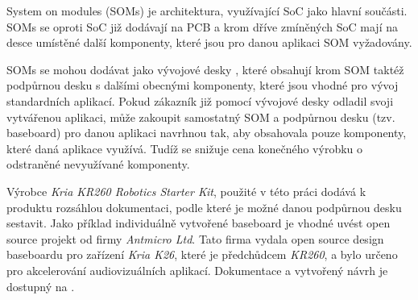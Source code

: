 \documentclass[a4paper, twoside, 11pt]{article}
\begin{document}
	System on modules (SOMs) je architektura, využívající SoC jako hlavní součásti. SOMs se oproti SoC již dodávají na PCB a krom dříve zmíněných SoC mají na desce umístěné další komponenty, které jsou pro danou aplikaci SOM vyžadovány. \cite{xilinx-what-is-a-som}\par
	SOMs se mohou dodávat jako vývojové desky \cite{xilinx-kria-kr260-robotics-starter-kit}, které obsahují krom SOM taktéž podpůrnou desku s dalšími obecnými komponenty, které jsou vhodné pro vývoj standardních aplikací. Pokud zákazník již pomocí vývojové desky odladil svoji vytvářenou aplikaci, může zakoupit samostatný SOM a podpůrnou desku (tzv. baseboard) pro danou aplikaci navrhnou tak, aby obsahovala pouze komponenty, které daná aplikace využívá. Tudíž se snižuje cena konečného výrobku o odstraněné nevyužívané komponenty.\par
	Výrobce \textit{Kria KR260 Robotics Starter Kit}, použité v této práci dodává k produktu rozsáhlou dokumentaci, podle které je možné danou podpůrnou desku sestavit. Jako příklad individuálně vytvořené baseboard je vhodné uvést open source projekt od firmy \textit{Antmicro Ltd}. Tato firma vydala open source design baseboardu pro zařízení \textit{Kria K26}, které je předchůdcem \textit{KR260}, a bylo určeno pro akcelerování audiovizuálních aplikací. Dokumentace a vytvořený návrh je dostupný na \cite{antmicro-open-source-kria-k26-baseboard}.
\end{document}
